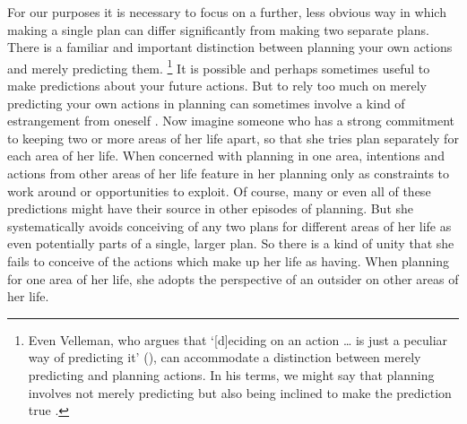 \documentclass[12pt,\papersize]{extarticle}
\begin{document}
For our purposes it is necessary to focus on a further, less obvious way in which making a single plan can differ significantly from making two separate plans. 
There is a familiar and  important distinction between planning  your own actions and merely predicting them.%
%
\footnote{
Even Velleman, who argues that `[d]eciding on an action … is just a peculiar way of predicting it' (\citeyear[p.\ 48]{Velleman:1985mc}), can accommodate a distinction between merely predicting and planning actions.
In his terms, we might say that 
planning involves not merely predicting but also being inclined to make the prediction true \citep[see][p.\ 195]{Velleman:2000fq}.
}
%
It is possible and perhaps sometimes useful to make predictions about your future actions.
But to rely too much on merely predicting your own actions in planning can sometimes involve a kind of estrangement from oneself \citep[compare][]{Moran:2001hr}.
Now imagine someone who has a strong commitment to keeping two or more areas of her life apart, so that she tries plan separately for each area of her life.
When concerned with planning in one area, intentions and actions from other areas of her life feature in her planning only as 
constraints to work around or opportunities to exploit.
Of course, many or even all of these predictions might have their source in other episodes of planning.
But 
she systematically avoids conceiving of any two plans for different areas of her life as even potentially parts of a single, larger plan.
So there is a kind of unity that she fails to conceive of the actions which make up her life as having.
When planning for one area of her life, she adopts the perspective of an outsider on other areas of her life.
\end{document}
